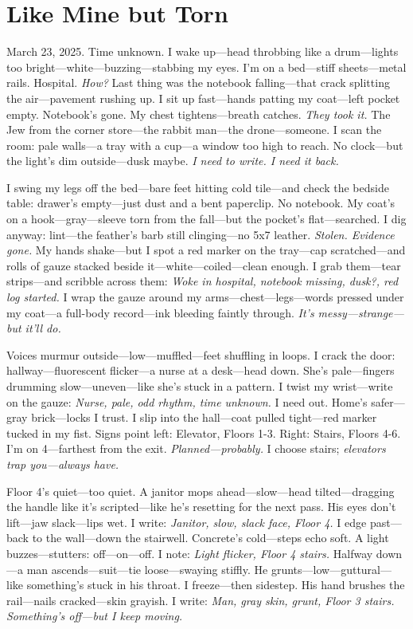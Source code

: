 \documentclass{article}
\begin{document}
\section*{Like Mine but Torn}

March 23, 2025. Time unknown. I wake up—head throbbing like a drum—lights too bright—white—buzzing—stabbing my eyes. I’m on a bed—stiff sheets—metal rails. Hospital. \textit{How?} Last thing was the notebook falling—that crack splitting the air—pavement rushing up. I sit up fast—hands patting my coat—left pocket empty. Notebook’s gone. My chest tightens—breath catches. \textit{They took it.} The Jew from the corner store—the rabbit man—the drone—someone. I scan the room: pale walls—a tray with a cup—a window too high to reach. No clock—but the light’s dim outside—dusk maybe. \textit{I need to write. I need it back.}

I swing my legs off the bed—bare feet hitting cold tile—and check the bedside table: drawer’s empty—just dust and a bent paperclip. No notebook. My coat’s on a hook—gray—sleeve torn from the fall—but the pocket’s flat—searched. I dig anyway: lint—the feather’s barb still clinging—no 5x7 leather. \textit{Stolen. Evidence gone.} My hands shake—but I spot a red marker on the tray—cap scratched—and rolls of gauze stacked beside it—white—coiled—clean enough. I grab them—tear strips—and scribble across them: \textit{Woke in hospital, notebook missing, dusk?, red log started.} I wrap the gauze around my arms—chest—legs—words pressed under my coat—a full-body record—ink bleeding faintly through. \textit{It’s messy—strange—but it’ll do.}

Voices murmur outside—low—muffled—feet shuffling in loops. I crack the door: hallway—fluorescent flicker—a nurse at a desk—head down. She’s pale—fingers drumming slow—uneven—like she’s stuck in a pattern. I twist my wrist—write on the gauze: \textit{Nurse, pale, odd rhythm, time unknown.} I need out. Home’s safer—gray brick—locks I trust. I slip into the hall—coat pulled tight—red marker tucked in my fist. Signs point left: Elevator, Floors 1-3. Right: Stairs, Floors 4-6. I’m on 4—farthest from the exit. \textit{Planned—probably.} I choose stairs; \textit{elevators trap you—always have.}

Floor 4’s quiet—too quiet. A janitor mops ahead—slow—head tilted—dragging the handle like it’s scripted—like he’s resetting for the next pass. His eyes don’t lift—jaw slack—lips wet. I write: \textit{Janitor, slow, slack face, Floor 4.} I edge past—back to the wall—down the stairwell. Concrete’s cold—steps echo soft. A light buzzes—stutters: off—on—off. I note: \textit{Light flicker, Floor 4 stairs.} Halfway down—a man ascends—suit—tie loose—swaying stiffly. He grunts—low—guttural—like something’s stuck in his throat. I freeze—then sidestep. His hand brushes the rail—nails cracked—skin grayish. I write: \textit{Man, gray skin, grunt, Floor 3 stairs.} \textit{Something’s off—but I keep moving.}
\end{document}
